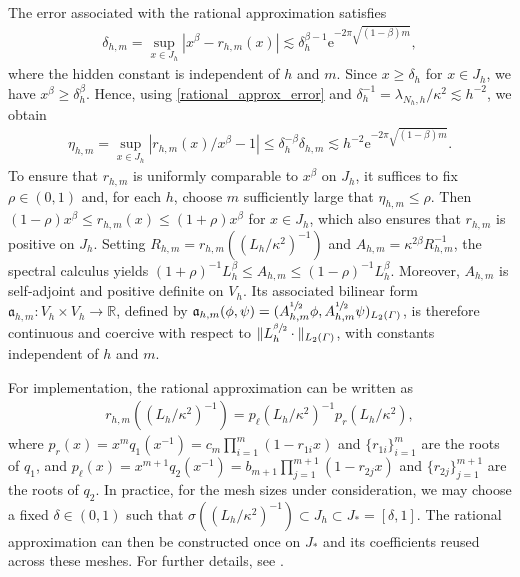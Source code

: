 \documentclass[numbers,webpdf]{ima-authoring-template}%
\theoremstyle{thmstyletwo}%
\numberwithin{equation}{section}
\begin{document}
The error associated with the rational approximation satisfies
\begin{align}
\label{rational_approx_error}
\textstyle
    \delta_{h,m}=\sup_{x\in J_h}|x^\beta-r_{h,m}(x)| \lesssim \delta_h^{\beta-1} \mathrm{e}^{-2\pi\sqrt{(1-\beta)m}},
\end{align}
where the hidden constant is independent of $h$ and $m$. Since $x\geq\delta_h$ for $x\in J_h$, we have $x^\beta\geq\delta_h^\beta$. Hence, using \eqref{rational_approx_error} and $\delta_h^{-1}= \lambda_{N_h,h}/\kappa^2\lesssim h^{-2}$, we obtain
\begin{align}
\label{relative_rational_error}
\textstyle
    \eta_{h,m}=\sup_{x\in J_h}\left|r_{h,m}(x)/x^\beta-1\right| \leq\delta_h^{-\beta}\delta_{h,m} \lesssim h^{-2}\mathrm{e}^{-2\pi\sqrt{(1-\beta)m}}.
\end{align}
To ensure that $r_{h,m}$ is uniformly comparable to $x^\beta$ on $J_h$, it suffices to fix $\rho\in(0,1)$ and, for each $h$, choose $m$ sufficiently large that $\eta_{h,m}\leq\rho$. Then $(1-\rho)x^\beta\leq r_{h,m}(x)\leq(1+\rho)x^\beta$ for $x\in J_h$, which also ensures that $r_{h,m}$ is positive on $J_h$. Setting $R_{h,m}=r_{h,m}((L_h/\kappa^2)^{-1})$ and $A_{h,m}=\kappa^{2\beta}R_{h,m}^{-1}$, the spectral calculus yields $(1+\rho)^{-1}L_h^\beta\leq A_{h,m}\leq(1-\rho)^{-1}L_h^\beta$. Moreover, $A_{h,m}$ is self-adjoint and positive definite on $V_h$. Its associated bilinear form $\mathfrak{a}_{h,m}:V_h\times V_h\to\mathbb{R}$, defined by $\mathfrak{a}_{h,m}(\phi,\psi) =(A_{h,m}^{\sfrac12}\phi,A_{h,m}^{\sfrac12}\psi)_{L_2({\mit\varGamma})}$, is therefore continuous and coercive with respect to $\|L_h^{\sfrac{\beta}{2}}\cdot\|_{L_2({\mit\varGamma})}$, with constants independent of $h$ and $m$.

For implementation, the rational approximation can be written as
\begin{align}
\label{rmdef}
    r_{h,m}((L_h/\kappa^2)^{-1})
    =p_\ell(L_h/\kappa^2)^{-1}p_r(L_h/\kappa^2),
\end{align}
where $p_r(x)=x^m q_1(x^{-1})=c_m\prod_{i=1}^m(1-r_{1i}x)$ and $\{r_{1i}\}_{i=1}^m$ are the roots of $q_1$, and $p_\ell(x)=x^{m+1}q_2(x^{-1})=b_{m+1}\prod_{j=1}^{m+1}(1-r_{2j}x)$ and $\{r_{2j}\}_{j=1}^{m+1}$ are the roots of $q_2$. In practice, for the mesh sizes under consideration, we may choose a fixed $\delta\in(0,1)$ such that $\sigma((L_h/\kappa^2)^{-1})\subset J_h\subset J_*=[\delta,1]$. The rational approximation can then be constructed once on $J_*$ and its coefficients reused across these meshes. For further details, see \cite[Section~3.5]{bolin2020rationalapprox}.
\end{document}
